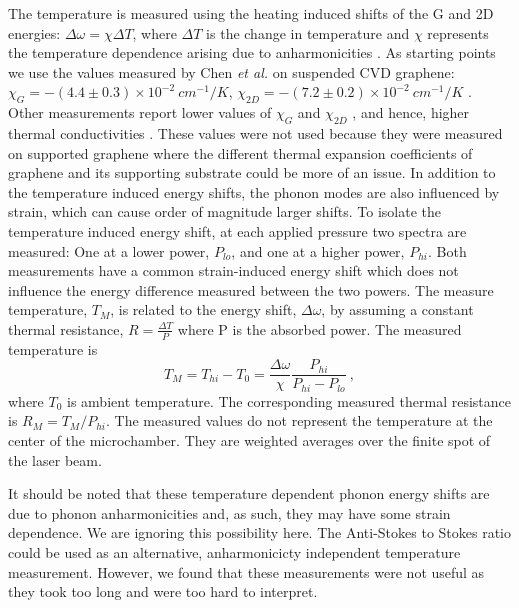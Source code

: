 The temperature is measured using the heating induced shifts of the G and 2D energies: $\Delta \omega=\chi \Delta T$, where $\Delta T$ is the change in temperature and $\chi$ represents the temperature dependence arising due to anharmonicities \cite{Bonini2007}.
As starting points we use the values measured by Chen \textit{et al.} on suspended CVD graphene: $\chi_G=-(4.4 \pm 0.3) \times 10^{-2} \ cm^{-1}/K$, $\chi_{2D}=-(7.2 \pm 0.2) \times 10^{-2} \ cm^{-1}/K$ \cite{Chen2011a}.
Other measurements report lower values of $\chi_G$ and $\chi_{2D}$ \cite{Calizo2007}, and hence, higher thermal conductivities \cite{Balandin2008}.
These values were not used because they were measured on supported graphene where the different thermal expansion coefficients of graphene and its supporting substrate could be more of an issue.
In addition to the temperature induced energy shifts, the phonon modes are also influenced by strain, which can cause order of magnitude larger shifts.
To isolate the temperature induced energy shift, at each applied pressure two spectra are measured: One at a lower power, $P_{lo}$, and one at a higher power, $P_{hi}$.
Both measurements have a common strain-induced energy shift which does not influence the energy difference measured between the two powers.
The measure temperature, $T_M$, is related to the energy shift, $\Delta \omega$, by assuming a constant thermal resistance, $R=\frac{\Delta T}{P}$ where P is the absorbed power.
The measured temperature is
\begin{equation}
	T_M=T_{hi}-T_0=\frac{\Delta \omega}{\chi} \frac{P_{hi}}{P_{hi}-P_{lo}} \ , \label{eq:therm:TM}
\end{equation}
where $T_0$ is ambient temperature.
The corresponding measured thermal resistance is $R_M=T_M/P_{hi}$.
The measured values do not represent the temperature at the center of the microchamber.
They are weighted averages over the finite spot of the laser beam.

It should be noted that these temperature dependent phonon energy shifts are due to phonon anharmonicities and, as such, they may have some strain dependence.
We are ignoring this possibility here.
The Anti-Stokes to Stokes ratio could be used as an alternative, anharmonicicty independent temperature measurement.
However, we found that these measurements were not useful as they took too long and were too hard to interpret.

